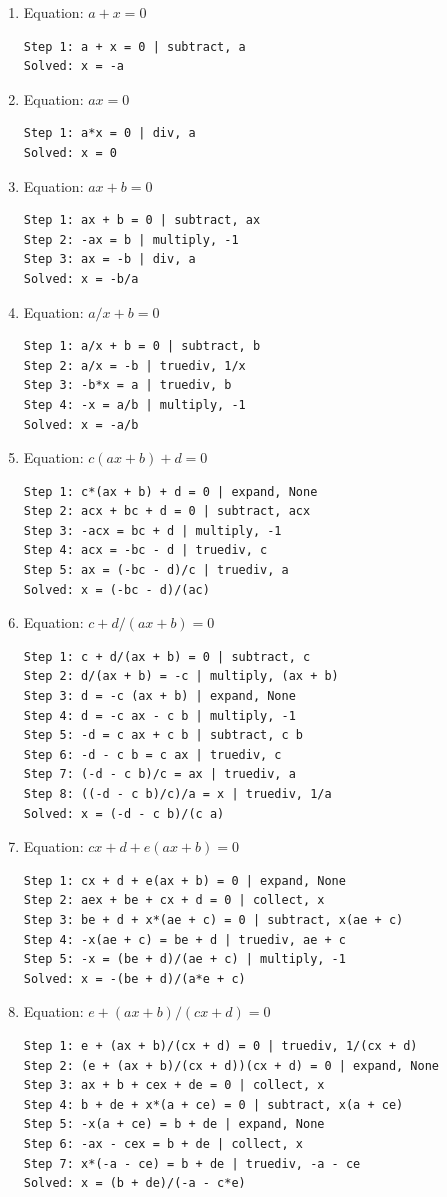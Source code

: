 \documentclass{article}
\theoremstyle{plain}
\theoremstyle{definition}
\theoremstyle{remark}
\begin{document}
\begin{enumerate}
\item Equation: $a + x = 0$
\begin{verbatim}
Step 1: a + x = 0 | subtract, a
Solved: x = -a
\end{verbatim}
\item Equation: $a x = 0$
\begin{verbatim}
Step 1: a*x = 0 | div, a
Solved: x = 0
\end{verbatim}
\item Equation: $a x + b = 0$
\begin{verbatim}
Step 1: ax + b = 0 | subtract, ax
Step 2: -ax = b | multiply, -1
Step 3: ax = -b | div, a
Solved: x = -b/a
\end{verbatim}
\item Equation: $a/x + b = 0$
\begin{verbatim}
Step 1: a/x + b = 0 | subtract, b
Step 2: a/x = -b | truediv, 1/x
Step 3: -b*x = a | truediv, b
Step 4: -x = a/b | multiply, -1
Solved: x = -a/b
\end{verbatim}
\item Equation: $c(a x + b) + d = 0$
\begin{verbatim}
Step 1: c*(ax + b) + d = 0 | expand, None
Step 2: acx + bc + d = 0 | subtract, acx
Step 3: -acx = bc + d | multiply, -1
Step 4: acx = -bc - d | truediv, c
Step 5: ax = (-bc - d)/c | truediv, a
Solved: x = (-bc - d)/(ac)
\end{verbatim}
\item Equation: $c + d/(a x + b) = 0$
\begin{verbatim}
Step 1: c + d/(ax + b) = 0 | subtract, c
Step 2: d/(ax + b) = -c | multiply, (ax + b)
Step 3: d = -c (ax + b) | expand, None
Step 4: d = -c ax - c b | multiply, -1
Step 5: -d = c ax + c b | subtract, c b
Step 6: -d - c b = c ax | truediv, c
Step 7: (-d - c b)/c = ax | truediv, a
Step 8: ((-d - c b)/c)/a = x | truediv, 1/a
Solved: x = (-d - c b)/(c a)
\end{verbatim}
\item Equation: $c x + d + e(a x + b) = 0$
\begin{verbatim}
Step 1: cx + d + e(ax + b) = 0 | expand, None
Step 2: aex + be + cx + d = 0 | collect, x
Step 3: be + d + x*(ae + c) = 0 | subtract, x(ae + c)
Step 4: -x(ae + c) = be + d | truediv, ae + c
Step 5: -x = (be + d)/(ae + c) | multiply, -1
Solved: x = -(be + d)/(a*e + c)
\end{verbatim}
\item Equation: $e + (a x + b)/(c x + d) = 0$
\begin{verbatim}
Step 1: e + (ax + b)/(cx + d) = 0 | truediv, 1/(cx + d)
Step 2: (e + (ax + b)/(cx + d))(cx + d) = 0 | expand, None
Step 3: ax + b + cex + de = 0 | collect, x
Step 4: b + de + x*(a + ce) = 0 | subtract, x(a + ce)
Step 5: -x(a + ce) = b + de | expand, None
Step 6: -ax - cex = b + de | collect, x
Step 7: x*(-a - ce) = b + de | truediv, -a - ce
Solved: x = (b + de)/(-a - c*e)
\end{verbatim}
\end{enumerate}
\end{document}
